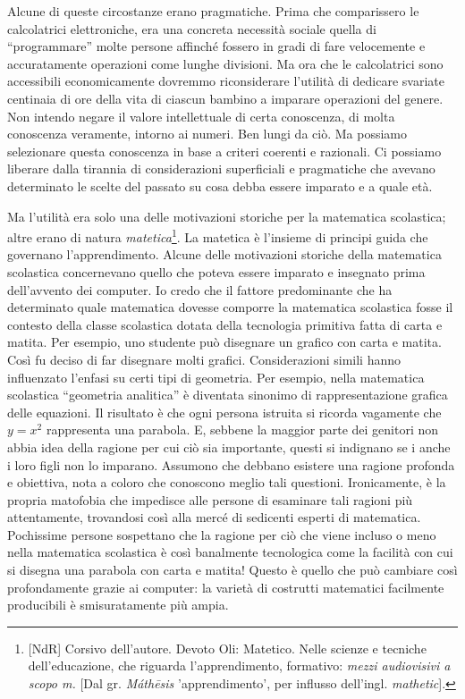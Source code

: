 Alcune di queste circostanze erano pragmatiche. Prima che comparissero le calcolatrici elettroniche,   era una concreta necessità sociale quella di “programmare” molte persone affinché fossero in gradi di fare velocemente e accuratamente operazioni come lunghe divisioni. Ma ora che le calcolatrici sono accessibili economicamente dovremmo  riconsiderare l'utilità di dedicare svariate centinaia di ore della vita di ciascun bambino a imparare operazioni del genere. Non intendo negare il valore intellettuale di certa conoscenza, di molta conoscenza veramente, intorno ai numeri. Ben lungi da ciò. Ma possiamo selezionare questa conoscenza in base a criteri coerenti e razionali. Ci possiamo liberare dalla tirannia di considerazioni superficiali e pragmatiche che avevano determinato le scelte del passato su cosa debba essere imparato e a quale età.

Ma l'utilità era solo una delle motivazioni storiche per la matematica scolastica; altre erano di natura \textit{matetica}\footnote{[NdR] Corsivo dell'autore. Devoto Oli: Matetico. Nelle scienze e tecniche dell'educazione, che riguarda l'apprendimento, formativo: \textit{mezzi audiovisivi a scopo m.} [Dal gr. \textit{Máthēsis} 'apprendimento', per influsso dell'ingl. \textit{mathetic}].}. La matetica è l'insieme di principi guida che governano l'apprendimento. Alcune delle motivazioni storiche della matematica scolastica concernevano quello che poteva essere imparato e insegnato prima dell'avvento dei computer. Io credo che il fattore predominante che ha determinato quale matematica dovesse comporre la matematica scolastica fosse il contesto della classe scolastica dotata della tecnologia primitiva fatta di carta e matita. Per esempio, uno studente può disegnare un grafico con carta e matita. Così fu deciso di far disegnare molti grafici. Considerazioni simili hanno influenzato l'enfasi su certi tipi di geometria. Per esempio, nella matematica scolastica “geometria analitica” è diventata sinonimo di rappresentazione grafica delle equazioni. Il risultato è che ogni persona istruita si ricorda vagamente che $y = x^2$ rappresenta una parabola. E, sebbene la maggior parte dei genitori non abbia idea della ragione per cui ciò sia importante, questi si indignano se i anche i loro figli non lo imparano. Assumono che debbano esistere una ragione profonda e obiettiva, nota a coloro che conoscono meglio tali questioni. Ironicamente, è la propria matofobia che impedisce alle persone di esaminare tali ragioni più attentamente, trovandosi così alla mercé di sedicenti esperti di matematica. Pochissime  persone sospettano che la ragione per ciò che viene incluso o meno nella matematica scolastica è così banalmente tecnologica come la facilità con cui si disegna una parabola con carta e matita! Questo è quello che può cambiare così profondamente grazie ai computer: la varietà di costrutti matematici facilmente producibili è smisuratamente più ampia.

